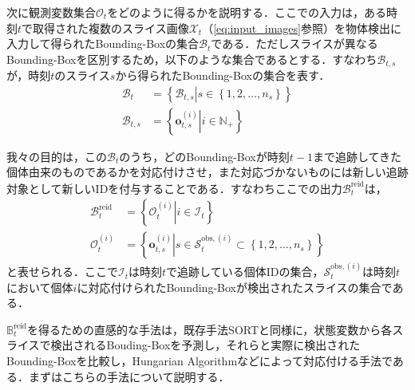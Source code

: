 次に観測変数集合$\mathcal{O}_t$をどのように得るかを説明する．ここでの入力は，ある時刻$t$で取得された複数のスライス画像$\mathcal{X}_t$（\ref{eq:input_images}参照）を物体検出に入力して得られたBounding-Boxの集合$\mathcal{B}_t$である．ただしスライスが異なるBounding-Boxを区別するため，以下のような集合であるとする．すなわち$\mathcal{B}_{t,s}$が，時刻$t$のスライス$s$から得られたBounding-Boxの集合を表す．
\begin{equation}
    \label{eq:input_bboxes}
    \begin{aligned}
        \mathcal{B}_t &= \left\{\left.\mathcal{B}_{t,s}\right|s \in \left\{1,2,\dots,n_s\right\}\right\}
        \\\mathcal{B}_{t,s} &= \left\{\left.\bm{o}_{t,s}^{(i)}\right|i \in \mathbb{N}_{+}\right\}
    \end{aligned}
\end{equation}

我々の目的は，この$\mathcal{B}_t$のうち，どのBounding-Boxが時刻$t-1$まで追跡してきた個体由来のものであるかを対応付けさせ，また対応づかないものには新しい追跡対象として新しいIDを付与することである．すなわちここでの出力$\mathcal{B}_t^{\text{reid}}$は，
\begin{equation}
    \begin{aligned}
        \mathcal{B}_t^{\text{reid}} &= \left\{\left.\mathcal{O}_t^{(i)}\right| i \in \mathcal{I}_t\right\}
        \\ \mathcal{O}_t^{(i)} &= \left\{\left.\bm{o}_{t,s}^{(i)}\right| s \in \mathcal{S}_t^{\text{obs},(i)} \subset \left\{1,2,\dots,n_s\right\}\right\}
    \end{aligned}
\end{equation}
と表せられる．ここで$\mathcal{I}_t$は時刻$t$で追跡している個体IDの集合，$\mathcal{S}_t^{\text{obs},(i)}$は時刻$t$において個体$i$に対応付けられたBounding-Boxが検出されたスライスの集合である．
\par
$\mathbb{B}_t^{\text{reid}}$を得るための直感的な手法は，既存手法SORTと同様に，状態変数から各スライスで検出されるBouding-Boxを予測し，それらと実際に検出されたBounding-Boxを比較し，Hungarian Algorithmなどによって対応付ける手法である．まずはこちらの手法について説明する．

